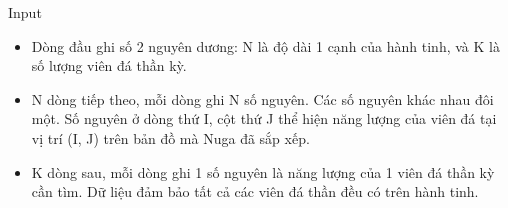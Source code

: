 Input  
\begin{itemize}
	\item     Dòng đầu ghi số 2 nguyên dương: N là độ dài 1 cạnh của hành tinh, và K là số lượng viên đá thần kỳ.   
	\item     N dòng tiếp theo, mỗi dòng ghi N số nguyên. Các số nguyên khác nhau đôi một. Số nguyên ở dòng thứ I, cột thứ J thể hiện năng lượng của viên đá tại vị trí (I, J) trên bản đồ mà Nuga đã sắp xếp.   
	\item     K dòng sau, mỗi dòng ghi 1 số nguyên là năng lượng của 1 viên đá thần kỳ cần tìm. Dữ liệu đảm bảo tất cả các viên đá thần đều có trên hành tinh.   
\end{itemize}